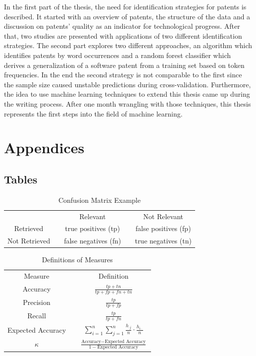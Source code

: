 \documentclass[12pt, a4paper]{scrartcl}
\newcommand{\ra}[1]{\renewcommand{\arraystretch}{#1}}
\theoremstyle{definition}
\begin{document}
In the first part of the thesis, the need for identification strategies for
patents is described. It started with an overview of patents, the structure of
the data and a discussion on patents' quality as an indicator for technological
progress. After that, two studies are presented with applications of two
different identification strategies. The second part explores two different
approaches, an algorithm which identifies patents by word occurrences and a
random forest classifier which derives a generalization of a software patent
from a training set based on token frequencies. In the end the second strategy
is not comparable to the first since the sample size  caused unstable
predictions during cross-validation. Furthermore, the idea to use machine
learning techniques to extend this thesis came up during the writing process.
After one month wrangling with those techniques, this thesis represents the
first steps into the field of machine learning.


\newpage

\appendix
\section*{Appendices}
\renewcommand{\thesubsection}{\Alph{subsection}}

\subsection{Tables}

\begin{table}[!hp]\caption{Confusion Matrix Example}\label{tab:confusion_example}\centering\ra{1.3}
\begin{tabular}{@{}cp{0.5cm}cp{0.5cm}c@{}} \toprule
 & & Relevant & & Not Relevant\\ \cline{1-1} \cline{3-3} \cline{5-5}
Retrieved & & true positives (tp) & & false positives (fp)\\
Not Retrieved & & false negatives (fn) & & true negatives (tn)\\
\bottomrule
\end{tabular}
\end{table}

\begin{table}[!hp]\caption{Definitions of Measures}\label{tab:definition_measure}\centering\ra{2}
\begin{tabular}{@{}cp{2cm}c@{}} \toprule
Measure & & Definition\\ \cline{1-1} \cline{3-3}
Accuracy & & $\frac{tp + tn}{tp + fp + fn + tn}$\\
Precision & & $\frac{tp}{tp + fp}$\\
Recall & & $\frac{tp}{tp + fn}$\\
Expected Accuracy & & $\sum^n_{i=1}\sum^n_{j=1}\frac{h_{\cdot j}}{n}\cdot\frac{h_{i \cdot}}{n}$\\
$\kappa$ & & $\frac{\text{Accuracy} - \text{Expected Accuracy}}{1 - \text{Expected Accuracy}}$\\
\bottomrule
\end{tabular}
\end{table}
\end{document}
